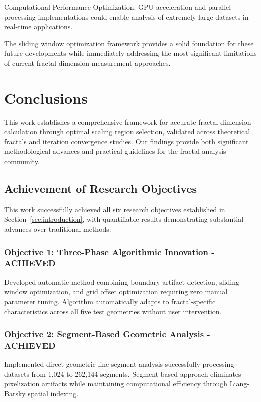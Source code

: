 \documentclass[preprint,12pt]{elsarticle}
\def\textbf#1{#1}%
\begin{document}
\textbf{Computational Performance Optimization}: GPU acceleration and parallel processing implementations could enable analysis of extremely large datasets in real-time applications.

The sliding window optimization framework provides a solid foundation for these future developments while immediately addressing the most significant limitations of current fractal dimension measurement approaches.

\section{Conclusions}
\label{sec:conclusions}

This work establishes a comprehensive framework for accurate fractal dimension calculation through optimal scaling region selection, validated across theoretical fractals and iteration convergence studies. Our findings provide both significant methodological advances and practical guidelines for the fractal analysis community.

\subsection{Achievement of Research Objectives}

This work successfully achieved all six research objectives established in Section~\ref{sec:introduction}, with quantifiable results demonstrating substantial advances over traditional methods:

\subsubsection{Objective 1: Three-Phase Algorithmic Innovation - ACHIEVED}
Developed automatic method combining boundary artifact detection, sliding window optimization, and grid offset optimization requiring \textbf{zero manual parameter tuning}. Algorithm automatically adapts to fractal-specific characteristics across all five test geometries without user intervention.

\subsubsection{Objective 2: Segment-Based Geometric Analysis - ACHIEVED}
Implemented direct geometric line segment analysis successfully processing datasets from 1,024 to 262,144 segments. Segment-based approach eliminates pixelization artifacts while maintaining computational efficiency through Liang-Barsky spatial indexing.
\end{document}
